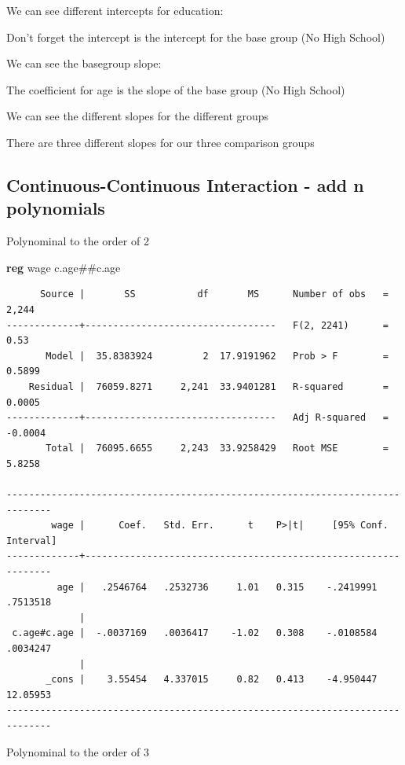 \documentclass[
]{book}
\newenvironment{Shaded}{\begin{snugshade}}{\end{snugshade}}
\newcommand{\KeywordTok}[1]{\textcolor[rgb]{0.13,0.29,0.53}{\textbf{#1}}}
\newcommand{\NormalTok}[1]{#1}
\begin{document}
We can see different intercepts for education:

Don't forget the intercept is the intercept for the base group (No High School)

We can see the basegroup slope:

The coefficient for age is the slope of the base group (No High School)

We can see the different slopes for the different groups

There are three different slopes for our three comparison groups

\subsection{Continuous-Continuous Interaction - add n polynomials}\label{continuous-continuous-interaction---add-n-polynomials}

Polynominal to the order of 2

\begin{Shaded}
\begin{Highlighting}[]
\KeywordTok{reg}\NormalTok{ wage c.age\#\#c.age}
\end{Highlighting}
\end{Shaded}

\begin{verbatim}
      Source |       SS           df       MS      Number of obs   =     2,244
-------------+----------------------------------   F(2, 2241)      =      0.53
       Model |  35.8383924         2  17.9191962   Prob > F        =    0.5899
    Residual |  76059.8271     2,241  33.9401281   R-squared       =    0.0005
-------------+----------------------------------   Adj R-squared   =   -0.0004
       Total |  76095.6655     2,243  33.9258429   Root MSE        =    5.8258

------------------------------------------------------------------------------
        wage |      Coef.   Std. Err.      t    P>|t|     [95% Conf. Interval]
-------------+----------------------------------------------------------------
         age |   .2546764   .2532736     1.01   0.315    -.2419991    .7513518
             |
 c.age#c.age |  -.0037169   .0036417    -1.02   0.308    -.0108584    .0034247
             |
       _cons |    3.55454   4.337015     0.82   0.413    -4.950447    12.05953
------------------------------------------------------------------------------
\end{verbatim}

Polynominal to the order of 3
\end{document}
